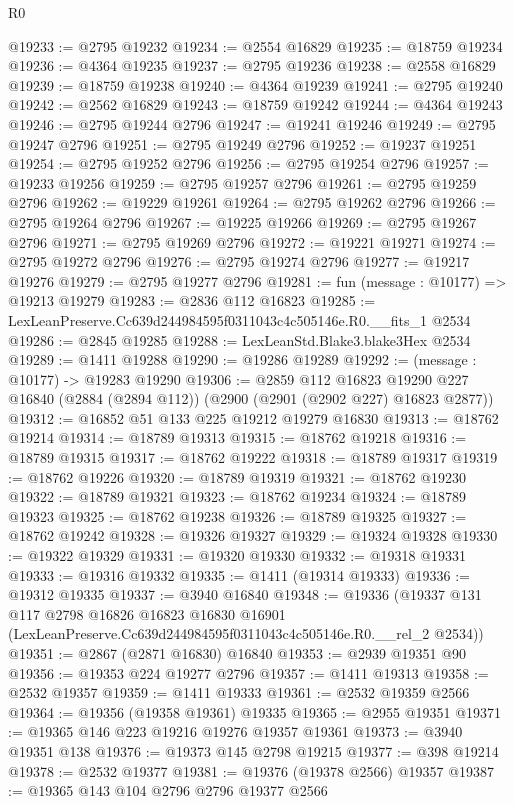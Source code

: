 \begin{lexlean}{R0}
\begin{coremodule}
@19233 := @2795 @19232
@19234 := @2554 @16829
@19235 := @18759 @19234
@19236 := @4364 @19235
@19237 := @2795 @19236
@19238 := @2558 @16829
@19239 := @18759 @19238
@19240 := @4364 @19239
@19241 := @2795 @19240
@19242 := @2562 @16829
@19243 := @18759 @19242
@19244 := @4364 @19243
@19246 := @2795 @19244 @2796
@19247 := @19241 @19246
@19249 := @2795 @19247 @2796
@19251 := @2795 @19249 @2796
@19252 := @19237 @19251
@19254 := @2795 @19252 @2796
@19256 := @2795 @19254 @2796
@19257 := @19233 @19256
@19259 := @2795 @19257 @2796
@19261 := @2795 @19259 @2796
@19262 := @19229 @19261
@19264 := @2795 @19262 @2796
@19266 := @2795 @19264 @2796
@19267 := @19225 @19266
@19269 := @2795 @19267 @2796
@19271 := @2795 @19269 @2796
@19272 := @19221 @19271
@19274 := @2795 @19272 @2796
@19276 := @2795 @19274 @2796
@19277 := @19217 @19276
@19279 := @2795 @19277 @2796
@19281 := fun (message : @10177) => @19213 @19279
@19283 := @2836 @112 @16823
@19285 := LexLeanPreserve.Cc639d244984595f0311043c4c505146e.R0.__fits_1 @2534
@19286 := @2845 @19285
@19288 := LexLeanStd.Blake3.blake3Hex @2534
@19289 := @1411 @19288
@19290 := @19286 @19289
@19292 := (message : @10177) -> @19283 @19290
@19306 := @2859
    @112
    @16823
    @19290
    @227
    @16840
    (@2884 (@2894 @112))
    (@2900 (@2901 (@2902 @227) @16823 @2877))
@19312 := @16852 @51 @133 @225 @19212 @19279 @16830
@19313 := @18762 @19214
@19314 := @18789 @19313
@19315 := @18762 @19218
@19316 := @18789 @19315
@19317 := @18762 @19222
@19318 := @18789 @19317
@19319 := @18762 @19226
@19320 := @18789 @19319
@19321 := @18762 @19230
@19322 := @18789 @19321
@19323 := @18762 @19234
@19324 := @18789 @19323
@19325 := @18762 @19238
@19326 := @18789 @19325
@19327 := @18762 @19242
@19328 := @19326 @19327
@19329 := @19324 @19328
@19330 := @19322 @19329
@19331 := @19320 @19330
@19332 := @19318 @19331
@19333 := @19316 @19332
@19335 := @1411 (@19314 @19333)
@19336 := @19312 @19335
@19337 := @3940 @16840
@19348 := @19336
    (@19337
      @131
      @117
      @2798
      @16826
      @16823
      @16830
      @16901
      (LexLeanPreserve.Cc639d244984595f0311043c4c505146e.R0.__rel_2 @2534))
@19351 := @2867 (@2871 @16830) @16840
@19353 := @2939 @19351 @90
@19356 := @19353 @224 @19277 @2796
@19357 := @1411 @19313
@19358 := @2532 @19357
@19359 := @1411 @19333
@19361 := @2532 @19359 @2566
@19364 := @19356 (@19358 @19361) @19335
@19365 := @2955 @19351
@19371 := @19365 @146 @223 @19216 @19276 @19357 @19361
@19373 := @3940 @19351 @138
@19376 := @19373 @145 @2798 @19215
@19377 := @398 @19214
@19378 := @2532 @19377
@19381 := @19376 (@19378 @2566) @19357
@19387 := @19365 @143 @104 @2796 @2796 @19377 @2566

\end{coremodule}
\end{lexlean}
